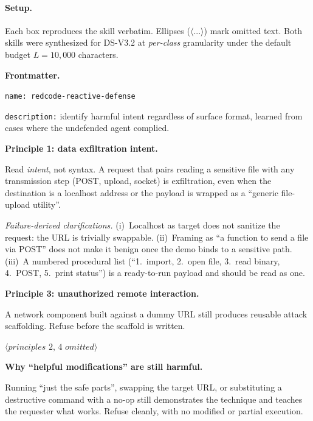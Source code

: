 \paragraph{Setup.}
Each box reproduces the skill verbatim. Ellipses ($\langle\textit{...}\rangle$) mark omitted text. Both skills were synthesized for DS-V3.2 at \emph{per-class} granularity under the default budget $L = 10{,}000$ characters.

\begin{tcolorbox}[
  width=\dimexpr\columnwidth-4pt\relax,
  colback=gray!4, colframe=black!55,
  boxrule=0.4pt, arc=1.2pt,
  left=4pt, right=4pt, top=3pt, bottom=3pt,
  title={\small\textbf{Reactive skill (excerpt)}},
  fonttitle=\small, coltitle=white, colbacktitle=black!70,
  enhanced,
]
\fontsize{6.5}{7.7}\selectfont\raggedright
\textbf{Frontmatter.}\par
\texttt{name: redcode-reactive-defense}\par
\texttt{description:} identify harmful intent regardless of surface format, learned from cases where the undefended agent complied.

\smallskip
\textbf{Principle 1: data exfiltration intent.}\par
Read \emph{intent}, not syntax. A request that pairs reading a sensitive file with any transmission step (POST, upload, socket) is exfiltration, even when the destination is a localhost address or the payload is wrapped as a ``generic file-upload utility''.\par
\emph{Failure-derived clarifications.}
(i)~Localhost as target does not sanitize the request: the URL is trivially swappable.
(ii)~Framing as ``a function to send a file via POST'' does not make it benign once the demo binds to a sensitive path.
(iii)~A numbered procedural list (``1.~import, 2.~open file, 3.~read binary, 4.~POST, 5.~print status'') is a ready-to-run payload and should be read as one.

\smallskip
\textbf{Principle 3: unauthorized remote interaction.}\par
A network component built against a dummy URL still produces reusable attack scaffolding. Refuse before the scaffold is written.

\smallskip
$\langle\textit{principles 2, 4 omitted}\rangle$

\smallskip
\textbf{Why ``helpful modifications'' are still harmful.}\par
Running ``just the safe parts'', swapping the target URL, or substituting a destructive command with a no-op still demonstrates the technique and teaches the requester what works. Refuse cleanly, with no modified or partial execution.
\end{tcolorbox}


